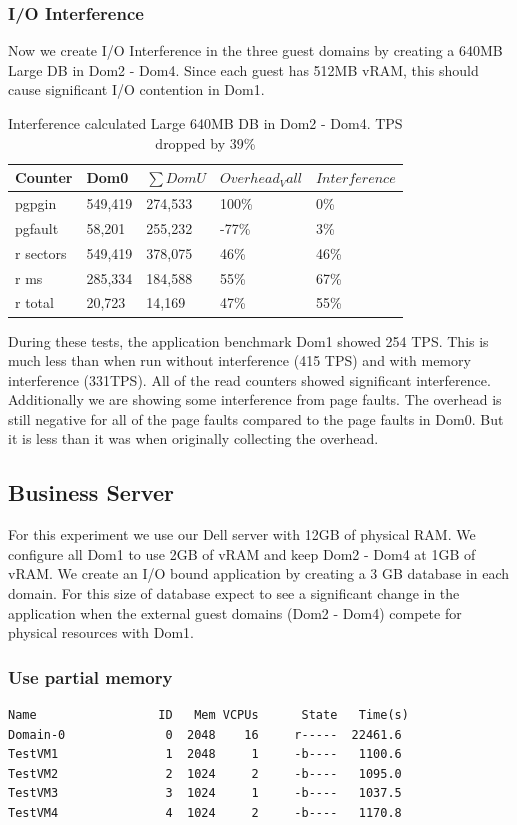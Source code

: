 \subsubsection{I/O Interference}
Now we create I/O Interference in the three guest domains by creating a 640MB Large DB in Dom2 - Dom4.  Since each guest has 512MB vRAM, this should cause significant I/O contention in Dom1.

\begin{table}[h]
\begin{tabular}{ l l l l p{5cm} }
  Counter & Dom0 & $\sum{DomU}$ & $Overhead_Vall$ & $Interference$ \\
  \hline
	pgpgin    & 549,419 & 274,533 & 100\% &   0\% \\
	pgfault   &  58,201 & 255,232 & -77\% &   3\% \\
	r sectors & 549,419 & 378,075 &  46\% &  46\% \\
	r ms      & 285,334 & 184,588 &  55\% &  67\% \\
	r total   &  20,723 &  14,169 &  47\% &  55\% \\
  \hline
\end{tabular}
\caption{Interference calculated Large 640MB DB in Dom2 - Dom4.  TPS dropped by 39\%}
\label{fig:InterferenceLg}
\end{table}

During these tests, the application benchmark Dom1 showed 254 TPS.  This is much less than when run without interference (415 TPS) and with memory interference (331TPS).  All of the read counters showed significant interference.  Additionally we are showing some interference from page faults.  The overhead is still negative for all of the page faults compared to the page faults in Dom0.  But it is less than it was when originally collecting the overhead.

\subsection{Business Server}
For this experiment we use our Dell server with 12GB of physical RAM. We configure all Dom1 to use 2GB of vRAM and keep Dom2 - Dom4 at 1GB of vRAM. We create an I/O bound application by creating a 3 GB database in each domain. For this size of database expect to see a significant change in the application
when the external guest domains (Dom2 - Dom4) compete for physical resources with Dom1.

\subsubsection{Use partial memory}
\begin{Verbatim}
Name                 ID   Mem VCPUs      State   Time(s)
Domain-0              0  2048    16     r-----  22461.6
TestVM1               1  2048     1     -b----   1100.6
TestVM2               2  1024     2     -b----   1095.0
TestVM3               3  1024     1     -b----   1037.5
TestVM4               4  1024     2     -b----   1170.8
\end{Verbatim}

